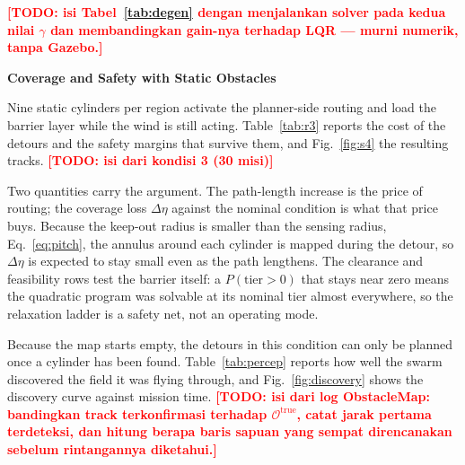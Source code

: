 \documentclass[10pt,letterpaper]{article}
\newcommand{\headingtwo}[1]{%
    \par\vspace{7pt}%
    {\centering\fontsize{12}{14}\selectfont\bfseries #1\par}%
    \vspace{3pt}\noindent\ignorespaces}
\newcommand{\TODO}[1]{\textcolor{red}{\textbf{[TODO: #1]}}}
\begin{document}
\TODO{isi Tabel~\ref{tab:degen} dengan menjalankan solver pada kedua nilai $\gamma$ dan
    membandingkan gain-nya terhadap LQR --- murni numerik, tanpa Gazebo.}

\headingtwo{Coverage and Safety with Static Obstacles}

Nine static cylinders per region activate the planner-side routing and load the barrier
layer while the wind is still acting. Table~\ref{tab:r3} reports the cost of the detours
and the safety margins that survive them, and Fig.~\ref{fig:s4} the resulting tracks.
\TODO{isi dari kondisi 3 (30 misi)}

Two quantities carry the argument. The path-length increase is the price of routing; the
coverage loss $\Delta\eta$ against the nominal condition is what that price buys. Because the keep-out radius
is smaller than the sensing radius, Eq.~\eqref{eq:pitch}, the annulus around each cylinder
is mapped during the detour, so $\Delta\eta$ is expected to stay small even as the path
lengthens. The clearance and feasibility rows test the barrier itself: a
$P(\mathrm{tier}>0)$ that stays near zero means the quadratic program was solvable at its
nominal tier almost everywhere, so the relaxation ladder is a safety net, not an
operating mode.

Because the map starts empty, the detours in this condition can only be planned once a
cylinder has been found. Table~\ref{tab:percep} reports how well the swarm discovered the
field it was flying through, and Fig.~\ref{fig:discovery} shows the discovery curve against
mission time. \TODO{isi dari log ObstacleMap: bandingkan track terkonfirmasi terhadap
    $\mathcal{O}^{\mathrm{true}}$, catat jarak pertama terdeteksi, dan hitung berapa baris
    sapuan yang sempat direncanakan sebelum rintangannya diketahui.}
\end{document}
